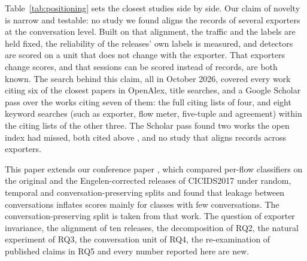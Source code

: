 \documentclass[pdflatex,sn-mathphys-num]{sn-jnl}
\newcommand{\cicids}{CICIDS2017}
\theoremstyle{thmstyleone}%
\theoremstyle{thmstylethree}%
\begin{document}
Table~\ref{tab:positioning} sets the closest studies side by side. Our claim of novelty is narrow and testable: no study we found aligns the records of several exporters at the conversation level. Built on that alignment, the traffic and the labels are held fixed, the reliability of the releases' own labels is measured, and detectors are scored on a unit that does not change with the exporter. That exporters change scores, and that sessions can be scored instead of records, are both known. The search behind this claim, all in October 2026, covered every work citing six of the closest papers in OpenAlex, title searches, and a Google Scholar pass over the works citing seven of them: the full citing lists of four, and eight keyword searches (such as exporter, flow meter, five-tuple and agreement) within the citing lists of the other three. The Scholar pass found two works the open index had missed, both cited above \cite{huang2026,alkhazaleh2026}, and no study that aligns records across exporters.

This paper extends our conference paper \cite{das2026iciset}, which compared per-flow classifiers on the original and the Engelen-corrected releases of \cicids{} under random, temporal and conversation-preserving splits and found that leakage between conversations inflates scores mainly for classes with few conversations. The conversation-preserving split is taken from that work. The question of exporter invariance, the alignment of ten releases, the decomposition of RQ2, the natural experiment of RQ3, the conversation unit of RQ4, the re-examination of published claims in RQ5 and every number reported here are new.
\end{document}
